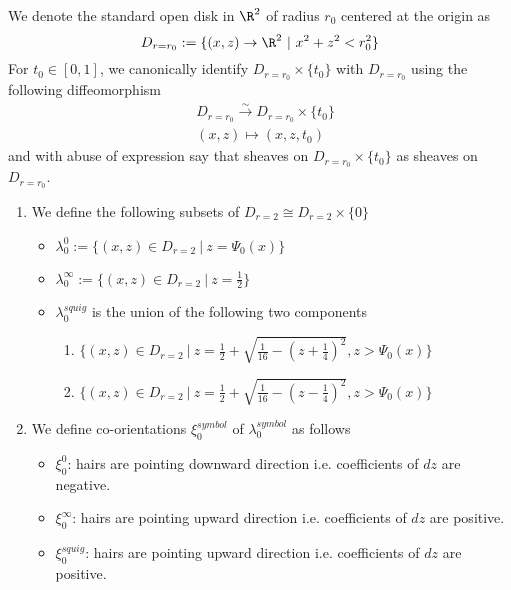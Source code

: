 \begin{definition}
We denote the standard open disk in $\R^2$ of radius $r_0$ centered at the origin as 
\[
D_{r=r_0} := \{(x,z)\rightarrow \R^2 ~|~ x^2+z^2 < r_0^2\}
\]
For $t_0 \in [0,1]$, we canonically identify $D_{r=r_0}\times \{t_0\}$ with $D_{r=r_0}$ using the following diffeomorphism
\begin{align*}
& D_{r=r_0} \xrightarrow{\sim} D_{r=r_0} \times \{t_0\} \\
& (x,z) \mapsto (x,z,t_0)
\end{align*}
and with abuse of expression say that sheaves on $D_{r=r_0}\times \{t_0\}$ as sheaves on $D_{r=r_0}$.
\end{definition}

\begin{definition}
\begin{enumerate}
\item We define the following subsets of $D_{r=2} \cong D_{r=2}\times \{0\}$
\begin{itemize}
\item $\lambda_0^0 := \{(x,z) \in D_{r=2} ~|~ z = \Psi_0(x)\}$

\item $\lambda_0^\infty := \{(x,z) \in D_{r=2} ~|~ z = \frac{1}{2} \}$

\item $\lambda_0^{squig}$ is the union of the following two components
\begin{enumerate}[label=(\roman*)]
\item $\{(x,z) \in D_{r=2} ~|~ z = \frac{1}{2} + \sqrt{\frac{1}{16} - (z+\frac{1}{4})^2}, z > \Psi_0(x) \}$

\item $\{(x,z) \in D_{r=2} ~|~ z = \frac{1}{2} + \sqrt{\frac{1}{16} - (z-\frac{1}{4})^2}, z > \Psi_0(x) \}$
\end{enumerate}
\end{itemize}

\item We define co-orientations $\xi_0^{symbol}$ of $\lambda_0^{symbol}$ as follows
\begin{itemize}
\item $\xi_0^0$: hairs are pointing downward direction i.e. coefficients of $dz$ are negative.

\item $\xi_0^\infty$: hairs are pointing upward direction i.e. coefficients of $dz$ are positive.

\item $\xi_0^{squig}$: hairs are pointing upward direction i.e. coefficients of $dz$ are positive.
\end{itemize}
\end{enumerate}
\end{definition}

